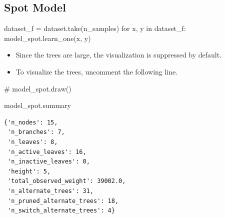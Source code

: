 \documentclass[
  letterpaper,
  DIV=11,
  numbers=noendperiod]{scrreprt}
\newenvironment{Shaded}{\begin{snugshade}}{\end{snugshade}}
\newcommand{\CommentTok}[1]{\textcolor[rgb]{0.37,0.37,0.37}{#1}}
\newcommand{\ControlFlowTok}[1]{\textcolor[rgb]{0.00,0.23,0.31}{#1}}
\newcommand{\KeywordTok}[1]{\textcolor[rgb]{0.00,0.23,0.31}{#1}}
\newcommand{\NormalTok}[1]{\textcolor[rgb]{0.00,0.23,0.31}{#1}}
\newcommand{\OperatorTok}[1]{\textcolor[rgb]{0.37,0.37,0.37}{#1}}
\providecommand{\tightlist}{%
  \setlength{\itemsep}{0pt}\setlength{\parskip}{0pt}}\usepackage{longtable,booktabs,array}
\begin{document}
\hypertarget{spot-model}{%
\subsection{Spot Model}\label{spot-model}}

\begin{Shaded}
\begin{Highlighting}[]
\NormalTok{dataset\_f }\OperatorTok{=}\NormalTok{ dataset.take(n\_samples)}
\ControlFlowTok{for}\NormalTok{ x, y }\KeywordTok{in}\NormalTok{ dataset\_f:}
\NormalTok{    model\_spot.learn\_one(x, y)}
\end{Highlighting}
\end{Shaded}

\begin{tcolorbox}[enhanced jigsaw, rightrule=.15mm, opacityback=0, colframe=quarto-callout-caution-color-frame, opacitybacktitle=0.6, toptitle=1mm, arc=.35mm, colbacktitle=quarto-callout-caution-color!10!white, coltitle=black, toprule=.15mm, leftrule=.75mm, titlerule=0mm, title=\textcolor{quarto-callout-caution-color}{\faFire}\hspace{0.5em}{Caution: Large Trees}, bottomrule=.15mm, breakable, bottomtitle=1mm, left=2mm, colback=white]

\begin{itemize}
\tightlist
\item
  Since the trees are large, the visualization is suppressed by default.
\item
  To visualize the trees, uncomment the following line.
\end{itemize}

\end{tcolorbox}

\begin{Shaded}
\begin{Highlighting}[]
\CommentTok{\# model\_spot.draw()}
\end{Highlighting}
\end{Shaded}

\begin{Shaded}
\begin{Highlighting}[]
\NormalTok{model\_spot.summary}
\end{Highlighting}
\end{Shaded}

\begin{verbatim}
{'n_nodes': 15,
 'n_branches': 7,
 'n_leaves': 8,
 'n_active_leaves': 16,
 'n_inactive_leaves': 0,
 'height': 5,
 'total_observed_weight': 39002.0,
 'n_alternate_trees': 31,
 'n_pruned_alternate_trees': 18,
 'n_switch_alternate_trees': 4}
\end{verbatim}
\end{document}
